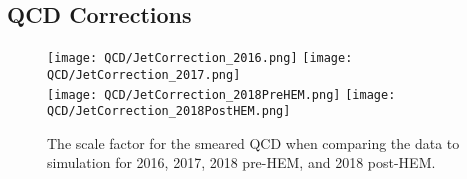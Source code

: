 \subsection{QCD Corrections}



%

\begin{figure}
	\begin{center}
  \texttt{[image: QCD/JetCorrection\_2016.png]}
  \texttt{[image: QCD/JetCorrection\_2017.png]} \\
  \texttt{[image: QCD/JetCorrection\_2018PreHEM.png]}
  \texttt{[image: QCD/JetCorrection\_2018PostHEM.png]} \\
	\end{center}
	\caption[QCD Jet Response Scale Factor]{The scale factor for the smeared QCD when comparing the data to simulation for 2016, 2017, 2018 pre-HEM, and 2018 post-HEM.}
	\label{fig:qcd-cr-response-sf}
\end{figure}

